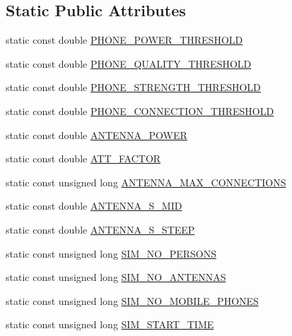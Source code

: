 \subsection*{Static Public Attributes}
\begin{DoxyCompactItemize}
\item 
static const double \hyperlink{class_constants_a1e95cbdc2db02f6147ddf8ac61a428ab}{P\+H\+O\+N\+E\+\_\+\+P\+O\+W\+E\+R\+\_\+\+T\+H\+R\+E\+S\+H\+O\+LD}
\item 
static const double \hyperlink{class_constants_a2c8a9d965bae29c19ff18c8b80260982}{P\+H\+O\+N\+E\+\_\+\+Q\+U\+A\+L\+I\+T\+Y\+\_\+\+T\+H\+R\+E\+S\+H\+O\+LD}
\item 
static const double \hyperlink{class_constants_a24b6069c3365fb95c4b853129e4d4a3e}{P\+H\+O\+N\+E\+\_\+\+S\+T\+R\+E\+N\+G\+T\+H\+\_\+\+T\+H\+R\+E\+S\+H\+O\+LD}
\item 
static const double \hyperlink{class_constants_a1cbf0a4e111b9d2e13b33e771a342b4f}{P\+H\+O\+N\+E\+\_\+\+C\+O\+N\+N\+E\+C\+T\+I\+O\+N\+\_\+\+T\+H\+R\+E\+S\+H\+O\+LD}
\item 
static const double \hyperlink{class_constants_a3f6f3825098d8eb1dc8081158c46c48a}{A\+N\+T\+E\+N\+N\+A\+\_\+\+P\+O\+W\+ER}
\item 
static const double \hyperlink{class_constants_a3738ccd4e7931b93885bdedf98528293}{A\+T\+T\+\_\+\+F\+A\+C\+T\+OR}
\item 
static const unsigned long \hyperlink{class_constants_af89a10a7d59ac020b1fa06cf673ef01f}{A\+N\+T\+E\+N\+N\+A\+\_\+\+M\+A\+X\+\_\+\+C\+O\+N\+N\+E\+C\+T\+I\+O\+NS}
\item 
static const double \hyperlink{class_constants_aea09e28749c0da58a4c831f9eabea773}{A\+N\+T\+E\+N\+N\+A\+\_\+\+S\+\_\+\+M\+ID}
\item 
static const double \hyperlink{class_constants_ae4b1b2c15d1e5bbb76464c03036c6baa}{A\+N\+T\+E\+N\+N\+A\+\_\+\+S\+\_\+\+S\+T\+E\+EP}
\item 
static const unsigned long \hyperlink{class_constants_a627fe53a717da1ca017b2467fb1dd4df}{S\+I\+M\+\_\+\+N\+O\+\_\+\+P\+E\+R\+S\+O\+NS}
\item 
static const unsigned long \hyperlink{class_constants_a0f6bc08399ad62727732e08a65c3bd0f}{S\+I\+M\+\_\+\+N\+O\+\_\+\+A\+N\+T\+E\+N\+N\+AS}
\item 
static const unsigned long \hyperlink{class_constants_a7da9e25a998c58c4388cbd45411f4232}{S\+I\+M\+\_\+\+N\+O\+\_\+\+M\+O\+B\+I\+L\+E\+\_\+\+P\+H\+O\+N\+ES}
\item 
static const unsigned long \hyperlink{class_constants_ad8a2d4817d599fd4f608e474bf1052ba}{S\+I\+M\+\_\+\+S\+T\+A\+R\+T\+\_\+\+T\+I\+ME}

\end{DoxyCompactItemize}

